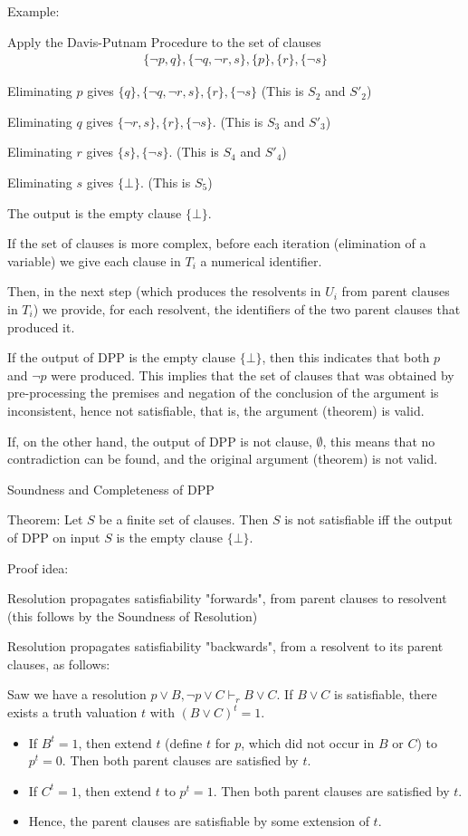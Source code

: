 \documentclass{article}
\begin{document}
Example:

Apply the Davis-Putnam Procedure to the set of clauses
\begin{align*}
\{\neg p, q\}, \{\neg q, \neg r, s\}, \{p\}, \{r\}, \{\neg s\}
\end{align*}

Eliminating $p$ gives $\{q\}, \{\neg q, \neg r, s\}, \{r\}, \{\neg s\}$ (This is $S_2$ and $S'_2$)

Eliminating $q$ gives $\{\neg r,s\},\{r\},\{\neg s\}$. (This is $S_3$ and $S'_3$)

Eliminating $r$ gives $\{s\},\{\neg s\}$. (This is $S_4$ and $S'_4$)

Eliminating $s$ gives $\{\bot\}$. (This is $S_5$)

The output is the empty clause $\{\bot\}$.


If the set of clauses is more complex, before each iteration (elimination of a variable) we give each clause in $T_i$ a numerical identifier.

Then, in the next step (which produces the resolvents in $U_i$ from parent clauses in $T_i$) we provide, for each resolvent, the identifiers of the two parent clauses that produced it.

If the output of DPP is the empty clause $\{\bot\}$, then this indicates that both $p$ and $\neg p$ were produced. This implies that the set of clauses that was obtained by pre-processing the premises and negation of the conclusion of the argument is inconsistent, hence not satisfiable, that is, the argument (theorem) is valid.

If, on the other hand, the output of DPP is not clause, $\emptyset$, this means that no contradiction can be found, and the original argument (theorem) is not valid.

Soundness and Completeness of DPP

Theorem: Let $S$ be a finite set of clauses. Then $S$ is not satisfiable iff the output of DPP on input $S$ is the empty clause $\{\bot\}$.

Proof idea:

Resolution propagates satisfiability "forwards", from parent clauses to resolvent (this follows by the Soundness of Resolution)

Resolution propagates satisfiability "backwards", from a resolvent to its parent clauses, as follows:

Saw we have a resolution $p \vee B, \neg p \vee C \vdash_r B \vee C$. If $B \vee C$ is satisfiable, there exists a truth valuation $t$ with $(B \vee C)^t = 1$. 
\begin{itemize}
    \item If $B^t=1$, then extend $t$ (define $t$ for $p$, which did not occur in $B$ or $C$) to $p^t = 0$. Then both parent clauses are satisfied by $t$.
    \item If $C^t = 1$, then extend $t$ to $p^t = 1$. Then both parent clauses are satisfied by $t$.
    \item Hence, the parent clauses are satisfiable by some extension of $t$.
\end{itemize}
\end{document}
